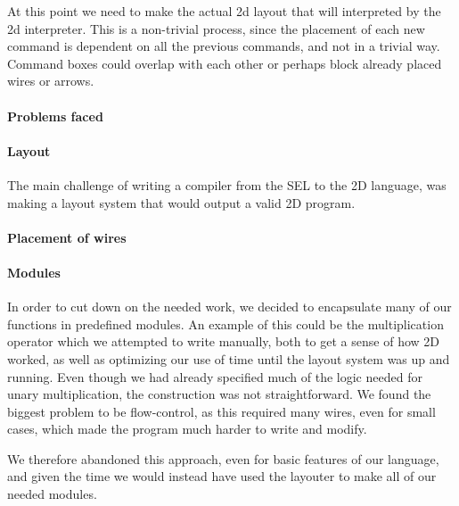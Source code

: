 
At this point we need to make the actual 2d layout that will
interpreted by the 2d interpreter. This is a non-trivial process,
since the placement of each new command is dependent on all the
previous commands, and not in a trivial way. Command boxes could
overlap with each other or perhaps block already placed wires or
arrows.

\paragraph{Problems faced}
\label{compiler:problems}

\paragraph{Layout}
\label{compiler:layout}
The main challenge of writing a compiler from the SEL to the 2D
language, was making a layout system that would output a valid 2D program.

\paragraph{Placement of wires}
\label{compiler:placement}

\paragraph{Modules}
\label{compiler:modules}
In order to cut down on the needed work, we decided to encapsulate
many of our functions in predefined modules. An example of this could
be the multiplication operator which we attempted to write manually,
both to get a sense of how 2D worked, as well as optimizing our use of
time until the layout system was up and running. Even though we had
already specified much of the logic needed for unary multiplication,
the construction was not straightforward. We found the biggest
problem to be flow-control, as this required many wires, even for
small cases, which made the program much harder to write and modify.

We therefore abandoned this approach, even for basic features of our
language, and given the time we would instead have used the layouter
to make all of our needed modules.

